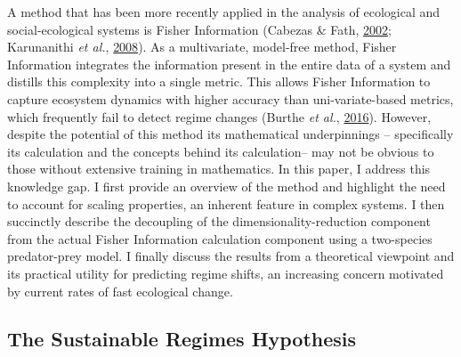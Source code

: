\documentclass[12pt,twoside,openany]{reedthesis}
\begin{document}
A method that has been more recently applied in the analysis of ecological and social-ecological systems is Fisher Information (Cabezas \& Fath, \protect\hyperlink{ref-cabezas_towards_2002}{2002}; Karunanithi \emph{et al.}, \protect\hyperlink{ref-karunanithi_detection_2008}{2008}). As a multivariate, model-free method, Fisher Information integrates the information present in the entire data of a system and distills this complexity into a single metric. This allows Fisher Information to capture ecosystem dynamics with higher accuracy than uni-variate-based metrics, which frequently fail to detect regime changes (Burthe \emph{et al.}, \protect\hyperlink{ref-burthe2016early}{2016}). However, despite the potential of this method its mathematical underpinnings -- specifically its calculation and the concepts behind its calculation-- may not be obvious to those without extensive training in mathematics. In this paper, I address this knowledge gap. I first provide an overview of the method and highlight the need to account for scaling properties, an inherent feature in complex systems. I then succinctly describe the decoupling of the dimensionality-reduction component from the actual Fisher Information calculation component using a two-species predator-prey model. I finally discuss the results from a theoretical viewpoint and its practical utility for predicting regime shifts, an increasing concern motivated by current rates of fast ecological change.

\hypertarget{the-sustainable-regimes-hypothesis}{%
\subsection{The Sustainable Regimes Hypothesis}\label{the-sustainable-regimes-hypothesis}}
\end{document}
